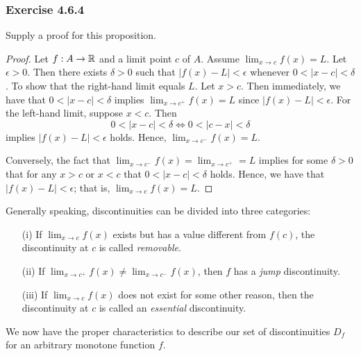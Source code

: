 \subsubsection{Exercise 4.6.4} Supply a proof for this proposition.
\begin{proof}
    Let \( f: A \to \mathbb{R}  \) and a limit point \( c  \) of \( A  \). Assume \( \lim_{ x \to c  } f(x) = L  \). Let \( \epsilon > 0  \). Then there exists \( \delta > 0  \) such that \( | f(x) - L  | < \epsilon  \) whenever \( 0 < | x - c  | < \delta   \). To show that the right-hand limit equals \( L  \). Let \( x > c  \). Then immediately, we have that \( 0 < | x - c  | < \delta  \) implies \( \lim_{ x \to c^{+}  } f(x) = L  \) since \( | f(x) - L  | < \epsilon. \) For the left-hand limit, suppose \( x < c  \). Then 
    \[  0 < | x - c  | < \delta \iff 0 < | c - x  | < \delta  \] implies \( | f(x) -  L | < \epsilon  \) holds. Hence, \( \lim_{ x \to c^{-} } f(x) = L  \).

    Conversely, the fact that \( \lim_{ x \to c^{-} } f(x) = \lim_{ x \to c^{+} } = L  \) implies for some \( \delta > 0  \) that for any \( x >  c  \) or \( x < c  \) that \( 0 < | x - c  | < \delta  \) holds. Hence, we have that \( | f(x) - L  | < \epsilon  \); that is,
    \( \lim_{ x \to c  } f(x) = L  \).
\end{proof}
Generally speaking, discontinuities can be divided into three categories: 
\begin{enumerate}
    \item[(i)] If \( \lim_{ x \to c  } f(x)  \) exists but has a value different from \( f(c) \), the discontinuity at \( c  \) is called \textit{removable}. 
    \item[(ii)] If \( \lim_{ x \to c^{+} } f(x) \neq \lim_{ x \to c^{-}  } f(x)  \), then \( f  \) has a \textit{jump} discontinuity.
    \item[(iii)] If \( \lim_{ x  \to c  }  f(x)  \) does not exist for some other reason, then the discontinuity at \( c  \) is called an \textit{essential} discontinuity.
\end{enumerate}

We now have the proper characteristics to describe our set of discontinuities \( D_f  \) for an arbitrary monotone function \( f \).

